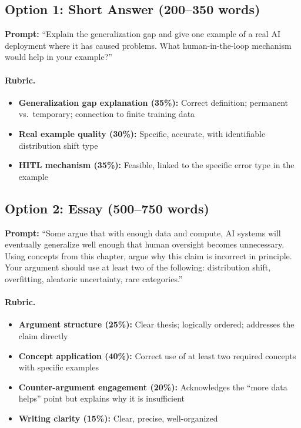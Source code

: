 \subsection{Option 1: Short Answer (200--350 words)}

\textbf{Prompt:} ``Explain the generalization gap and give one example of a real AI deployment where it has caused problems. What human-in-the-loop mechanism would help in your example?''

\paragraph{Rubric.}
\begin{itemize}
    \item \textbf{Generalization gap explanation (35\%):} Correct definition; permanent vs.\ temporary; connection to finite training data
    \item \textbf{Real example quality (30\%):} Specific, accurate, with identifiable distribution shift type
    \item \textbf{HITL mechanism (35\%):} Feasible, linked to the specific error type in the example
\end{itemize}

\subsection{Option 2: Essay (500--750 words)}

\textbf{Prompt:} ``Some argue that with enough data and compute, AI systems will eventually generalize well enough that human oversight becomes unnecessary. Using concepts from this chapter, argue why this claim is incorrect in principle. Your argument should use at least two of the following: distribution shift, overfitting, aleatoric uncertainty, rare categories.''

\paragraph{Rubric.}
\begin{itemize}
    \item \textbf{Argument structure (25\%):} Clear thesis; logically ordered; addresses the claim directly
    \item \textbf{Concept application (40\%):} Correct use of at least two required concepts with specific examples
    \item \textbf{Counter-argument engagement (20\%):} Acknowledges the ``more data helps'' point but explains why it is insufficient
    \item \textbf{Writing clarity (15\%):} Clear, precise, well-organized
\end{itemize}

